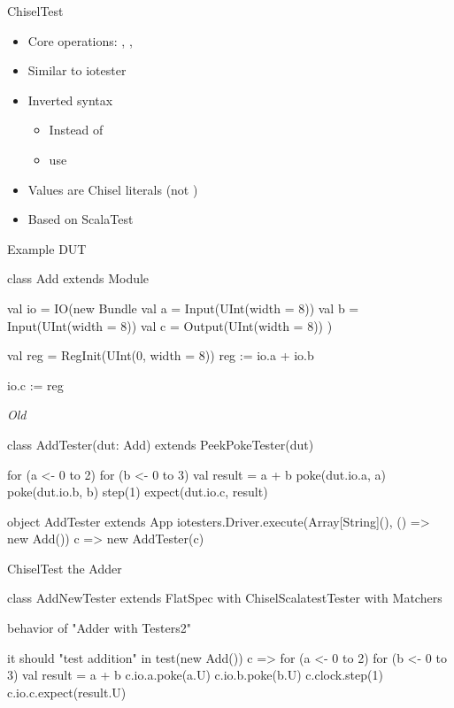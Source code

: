 \begin{frame}[fragile]{ChiselTest}
\begin{itemize}
\item Core operations: , , 
\item Similar to iotester
\item Inverted syntax
\begin{itemize}
\item Instead of 
\item use 
\end{itemize}
\item Values are Chisel literals (not )
\item Based on ScalaTest
\end{itemize}
\end{frame}



\begin{frame}[fragile]{Example DUT}
\begin{chisel}
class Add extends Module {
  val io = IO(new Bundle {
    val a = Input(UInt(width = 8))
    val b = Input(UInt(width = 8))
    val c = Output(UInt(width = 8))
  })

  val reg = RegInit(UInt(0, width = 8))
  reg := io.a + io.b

  io.c := reg
}
\end{chisel}
\end{frame}

\begin{frame}[fragile]{\emph{Old} }
\begin{chisel}
class AddTester(dut: Add) extends PeekPokeTester(dut) {

  for (a <- 0 to 2) {
    for (b <- 0 to 3) {
      val result = a + b
      poke(dut.io.a, a)
      poke(dut.io.b, b)
      step(1)
      expect(dut.io.c, result)
    }
  }
}

object AddTester extends App {
  iotesters.Driver.execute(Array[String](), () => new Add()) { c => new AddTester(c) }
}
\end{chisel}
\end{frame}

\begin{frame}[fragile]{ChiselTest the Adder}
\begin{chisel}
class AddNewTester extends FlatSpec with ChiselScalatestTester with Matchers {

  behavior of "Adder with Testers2"

  it should "test addition" in {
    test(new Add()) { c =>
      for (a <- 0 to 2) {
        for (b <- 0 to 3) {
          val result = a + b
          c.io.a.poke(a.U)
          c.io.b.poke(b.U)
          c.clock.step(1)
          c.io.c.expect(result.U)
        }
      }
    }
  }
}
\end{chisel}
\end{frame}


